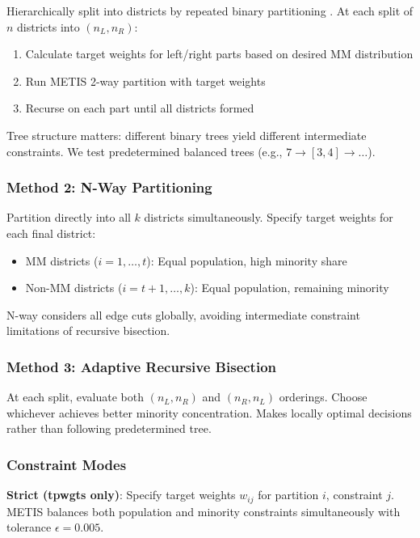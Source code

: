 Hierarchically split into districts by repeated binary partitioning \citep{dellaLibera2026recursive}. At each split of $n$ districts into $(n_L, n_R)$:

\begin{enumerate}
\item Calculate target weights for left/right parts based on desired MM distribution
\item Run METIS 2-way partition with target weights
\item Recurse on each part until all districts formed
\end{enumerate}

Tree structure matters: different binary trees yield different intermediate constraints. We test predetermined balanced trees (e.g., $7 \to [3,4] \to \ldots$).

\subsubsection{Method 2: N-Way Partitioning}

Partition directly into all $k$ districts simultaneously. Specify target weights for each final district:
\begin{itemize}
\item MM districts ($i = 1, \ldots, t$): Equal population, high minority share
\item Non-MM districts ($i = t+1, \ldots, k$): Equal population, remaining minority
\end{itemize}

N-way considers all edge cuts globally, avoiding intermediate constraint limitations of recursive bisection.

\subsubsection{Method 3: Adaptive Recursive Bisection}

At each split, evaluate both $(n_L, n_R)$ and $(n_R, n_L)$ orderings. Choose whichever achieves better minority concentration. Makes locally optimal decisions rather than following predetermined tree.

\subsubsection{Constraint Modes}

\textbf{Strict (tpwgts only)}: Specify target weights $w_{ij}$ for partition $i$, constraint $j$. METIS balances both population and minority constraints simultaneously with tolerance $\epsilon = 0.005$.

